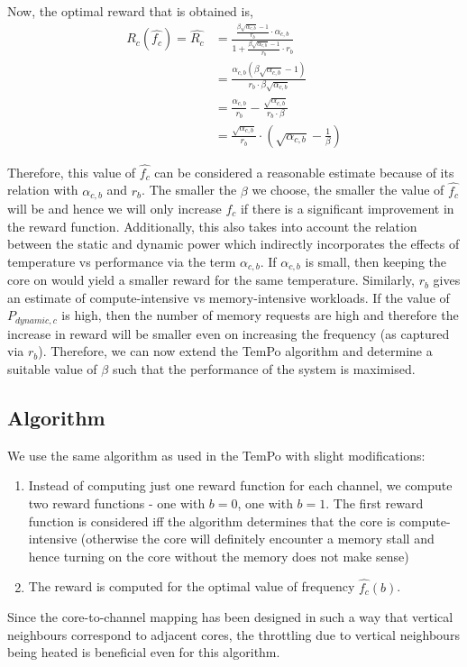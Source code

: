 \documentclass[11pt]{article}
\begin{document}
Now, the optimal reward that is obtained is,
\begin{equation}
    \begin{split}
        R_c(\hat{f_c}) = \hat{R_c} &= \frac{\frac{\beta\sqrt{\alpha_{c,b}} - 1}{r_b}\cdot\alpha_{c,b}}{1 + \frac{\beta\sqrt{\alpha_{c,b}} - 1}{r_b}\cdot r_b}\\
        &= \frac{\alpha_{c,b}\left(\beta\sqrt{\alpha_{c,b}} - 1\right)}{r_b\cdot\beta\sqrt{\alpha_{c,b}}}\\
        &= \frac{\alpha_{c,b}}{r_b} - \frac{\sqrt{\alpha_{c,b}}}{r_b\cdot\beta}\\
        &= \frac{\sqrt{\alpha_{c,b}}}{r_b}\cdot\left(\sqrt{\alpha_{c,b}} - \frac{1}{\beta}\right)
    \end{split}
\end{equation}

Therefore, this value of $\hat{f_c}$ can be considered a reasonable estimate because of its relation with $\alpha_{c,b}$ and $r_b$. The smaller the $\beta$ we choose, the smaller the value of $\hat{f_c}$ will be and hence we will only increase $f_c$ if there is a significant improvement in the reward function. Additionally, this also takes into account the relation between the static and dynamic power which indirectly incorporates the effects of temperature vs performance via the term $\alpha_{c,b}$. If $\alpha_{c,b}$ is small, then keeping the core on would yield a smaller reward for the same temperature. Similarly, $r_b$ gives an estimate of compute-intensive vs memory-intensive workloads. If the value of $P_{dynamic,c}$ is high, then the number of memory requests are high and therefore the increase in reward will be smaller even on increasing the frequency (as captured via $r_b$). Therefore, we can now extend the TemPo algorithm and determine a suitable value of $\beta$ such that the performance of the system is maximised.

\subsection{Algorithm}
We use the same algorithm as used in the TemPo with slight modifications:
\begin{enumerate}
    \item Instead of computing just one reward function for each channel, we compute two reward functions - one with $b = 0$, one with $b = 1$. The first reward function is considered iff the algorithm determines that the core is compute-intensive (otherwise the core will definitely encounter a memory stall and hence turning on the core without the memory does not make sense)
    \item The reward is computed for the optimal value of frequency $\hat{f_c}(b)$.
\end{enumerate}
Since the core-to-channel mapping has been designed in such a way that vertical neighbours correspond to adjacent cores, the throttling due to vertical neighbours being heated is beneficial even for this algorithm.
\end{document}
